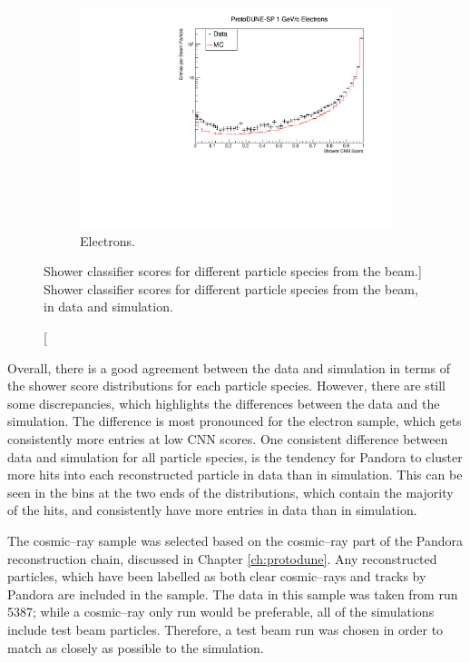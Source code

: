 \begin{figure}
	\begin{subfigure}[b]{0.68\textwidth}
		\centering
		\includegraphics[width=\textwidth]{figures/hit_cnn_electron.pdf}
		\caption {Electrons.}
		\label{fig:beam_electron_cnn}
	\end{subfigure}

	\caption
	[Shower classifier scores for different particle species from the \protodune{} 
	beam.]
	{Shower classifier scores for different particle species from the \protodune{} 
	beam, in data and simulation.}
	\label{fig:cnn_scores_beam}

\end{figure}

Overall, there is a good agreement between the data and simulation in terms of
the shower score distributions for each particle species. However, there are
still some discrepancies, which highlights the differences between the data and
the simulation. The difference is most pronounced for the electron sample, which
gets consistently more entries at low CNN scores. One consistent difference
between data and simulation for all particle species, is the tendency for 
Pandora to cluster more hits into each reconstructed particle in data than in 
simulation. This can be seen in the bins at the two ends of the distributions,
which contain the majority of the hits, and consistently have more entries in 
data than in simulation.

The cosmic--ray sample was selected based on the cosmic--ray part of the
Pandora reconstruction chain, discussed in Chapter \ref{ch:protodune}. Any
reconstructed particles, which have been labelled as both clear cosmic--rays
and tracks by Pandora are included in the sample. The data in this sample was
taken from run 5387; while a cosmic--ray only run would be preferable, all of 
the \protodune{} simulations include test beam particles. Therefore, a test beam
run was chosen in order to match as closely as possible to the simulation.

